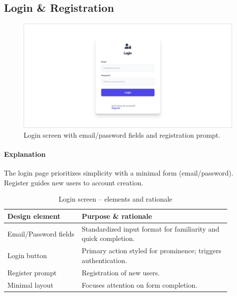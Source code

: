 \documentclass[11pt,a4paper]{article}
\begin{document}

	\subsection{Login \& Registration}\label{subsec:login-register}

	\begin{figure}[H]
		\centering
		\includegraphics[width=1.0\linewidth]{pictures/main/RegisterAccount_Figma}%
		\caption{Login screen with email/password fields and registration prompt.}
		\label{fig:ui-login}
	\end{figure}

	\paragraph{Explanation}%
	The login page prioritizes simplicity with a minimal form (email/password).
	Register guides new users to account creation. 
	\begin{table}[H]
		\centering
		\caption{Login screen – elements and rationale}
		\label{tab:login-elements}
		\begin{tabular}{p{0.30\linewidth} p{0.60\linewidth}}
			\toprule
			\textbf{Design element} & \textbf{Purpose \& rationale} \\ \midrule
			Email/Password fields   & Standardized input format for familiarity and quick completion. \\
			Login button       & Primary action styled for prominence; triggers authentication. \\
			Register prompt        & Registration of new users. \\
			Minimal layout         & Focuses attention on form completion. \\
			\bottomrule
		\end{tabular}
	\end{table}
	
\end{document}
